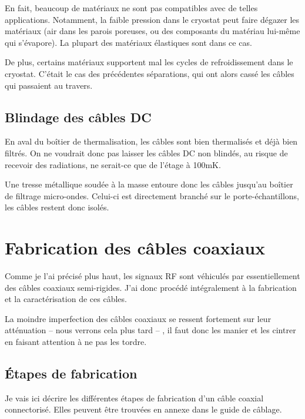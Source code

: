 En fait, beaucoup de matériaux ne sont pas compatibles avec de telles applications. Notamment, la faible pression dans le cryostat peut faire dégazer les matériaux (air dans les parois poreuses, ou des composants du matériau lui-même qui s'évapore). La plupart des matériaux élastiques sont dans ce cas.

De plus, certains matériaux supportent mal les cycles de refroidissement dans le cryostat. C'était le cas des précédentes séparations, qui ont alors cassé les câbles qui passaient au travers.

\subsection{Blindage des câbles DC}
En aval du boîtier de thermalisation, les câbles sont bien thermalisés et déjà bien filtrés. On ne voudrait donc pas laisser les câbles DC non blindés, au risque de recevoir des radiations, ne serait-ce que de l'étage à 100mK.

Une tresse métallique soudée à la masse entoure donc les câbles jusqu'au boîtier de filtrage micro-ondes. Celui-ci est directement branché sur le porte-échantillons, les câbles restent donc isolés.




\newpage
\section{Fabrication des câbles coaxiaux}
Comme je l'ai précisé plus haut, les signaux RF sont véhiculés par essentiellement des câbles coaxiaux semi-rigides. J'ai donc procédé intégralement à la fabrication et la caractérisation de ces câbles.
\newline

La moindre imperfection des câbles coaxiaux se ressent fortement sur leur atténuation -- nous verrons cela plus tard -- , il faut donc les manier et les cintrer en faisant attention à ne pas les tordre.

\subsection{Étapes de fabrication}
Je vais ici décrire les différentes étapes de fabrication d'un câble coaxial connectorisé. Elles peuvent être trouvées en annexe dans le guide de câblage.

